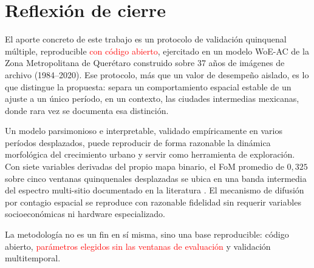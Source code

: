 \section{Reflexión de cierre}

El aporte concreto de este trabajo es un protocolo de validación quinquenal múltiple, reproducible \textcolor{red}{con código abierto}, ejercitado en un modelo WoE-AC de la Zona Metropolitana de Querétaro construido sobre 37 años de imágenes de archivo (1984--2020). Ese protocolo, más que un valor de desempeño aislado, es lo que distingue la propuesta: separa un comportamiento espacial estable de un ajuste a un único período, en un contexto, las ciudades intermedias mexicanas, donde rara vez se documenta esa distinción.

Un modelo parsimonioso e interpretable, validado empíricamente en varios períodos desplazados, puede reproducir de forma razonable la dinámica morfológica del crecimiento urbano y servir como herramienta de exploración. Con siete variables derivadas del propio mapa binario, el FoM promedio de $0{,}325$ sobre cinco ventanas quinquenales desplazadas se ubica en una banda intermedia del espectro multi-sitio documentado en la literatura \parencite{pontius2008comparing}. El mecanismo de difusión por contagio espacial se reproduce con razonable fidelidad sin requerir variables socioeconómicas ni hardware especializado.

La metodología no es un fin en sí misma, sino una base reproducible: código abierto, \textcolor{red}{parámetros elegidos sin las ventanas de evaluación} y validación multitemporal.
